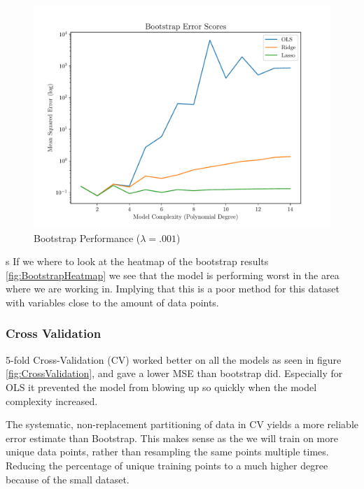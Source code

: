 \documentclass[twocolumn,aps]{revtex4}
\begin{document}
\begin{figure}[h]
    \centering
    \includegraphics[width=.95 \linewidth]{Figures/Bootstrap.pdf}
    \caption{Bootstrap Performance ($\lambda=.001$)}
    \label{fig:BootstrapPerformance}
\end{figure}
s
If we where to look at the heatmap of the bootstrap results \ref{fig:BootstrapHeatmap} we see that the model is performing worst in the area where we are working in.
Implying that this is a poor method for this dataset with variables close to the amount of data points.


\subsubsection{Cross Validation}
5-fold Cross-Validation (CV) worked better on all the models as seen in figure \ref{fig:CrossValidation}, and gave a lower MSE than bootstrap did.
Especially for OLS it prevented the model from blowing up so quickly when the model complexity increased.

The systematic, non-replacement partitioning of data in CV yields a more reliable error estimate than Bootstrap.
This makes sense as the we will train on more unique data points, rather than resampling the same points multiple times.
Reducing the percentage of unique training points to a much higher degree because of the small dataset.
\end{document}

